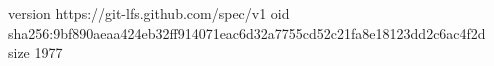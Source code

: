 version https://git-lfs.github.com/spec/v1
oid sha256:9bf890aeaa424eb32ff914071eac6d32a7755cd52c21fa8e18123dd2c6ac4f2d
size 1977
